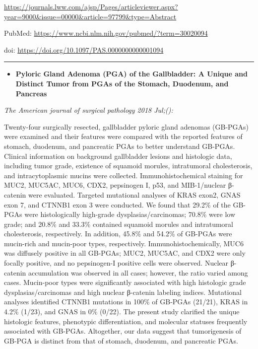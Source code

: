 \documentclass[]{article}
\providecommand{\tightlist}{%
  \setlength{\itemsep}{0pt}\setlength{\parskip}{0pt}}
\begin{document}
\url{https://journals.lww.com/ajsp/Pages/articleviewer.aspx?year=9000\&issue=00000\&article=97799\&type=Abstract}

PubMed: \url{https://www.ncbi.nlm.nih.gov/pubmed/?term=30020094}

doi: \url{https://doi.org/10.1097/PAS.0000000000001094}

{}

{}

\begin{center}\rule{0.5\linewidth}{\linethickness}\end{center}

\begin{itemize}
\tightlist
\item
  \textbf{Pyloric Gland Adenoma (PGA) of the Gallbladder: A Unique and
  Distinct Tumor from PGAs of the Stomach, Duodenum, and Pancreas}
\end{itemize}

\emph{The American journal of surgical pathology 2018 Jul;():}

Twenty-four surgically resected, gallbladder pyloric gland adenomas
(GB-PGAs) were examined and their features were compared with the
reported features of stomach, duodenum, and pancreatic PGAs to better
understand GB-PGAs. Clinical information on background gallbladder
lesions and histologic data, including tumor grade, existence of
squamoid morules, intratumoral cholesterosis, and intracytoplasmic
mucins were collected. Immunohistochemical staining for MUC2, MUC5AC,
MUC6, CDX2, pepsinogen I, p53, and MIB-1/nuclear β-catenin were
evaluated. Targeted mutational analyses of KRAS exon2, GNAS exon 7, and
CTNNB1 exon 3 were conducted. We found that 29.2\% of the GB-PGAs were
histologically high-grade dysplasias/carcinomas; 70.8\% were low grade;
and 20.8\% and 33.3\% contained squamoid morules and intratumoral
cholesterosis, respectively. In addition, 45.8\% and 54.2\% of GB-PGAs
were mucin-rich and mucin-poor types, respectively.
Immunohistochemically, MUC6 was diffusely positive in all GB-PGAs; MUC2,
MUC5AC, and CDX2 were only focally positive, and no pepsinogen-I
positive cells were observed. Nuclear β-catenin accumulation was
observed in all cases; however, the ratio varied among cases. Mucin-poor
types were significantly associated with high histologic grade
dysplasias/carcinomas and high nuclear β-catenin labeling indices.
Mutational analyses identified CTNNB1 mutations in 100\% of GB-PGAs
(21/21), KRAS in 4.2\% (1/23), and GNAS in 0\% (0/22). The present study
clarified the unique histologic features, phenotypic differentiation,
and molecular statuses frequently associated with GB-PGAs. Altogether,
our data suggest that tumorigenesis of GB-PGA is distinct from that of
stomach, duodenum, and pancreatic PGAs.
\end{document}
